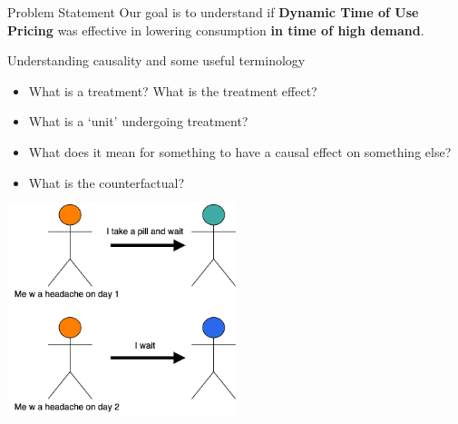 \documentclass{beamer}
\begin{document}
\begin{frame}{Problem Statement}
  Our goal is to understand if \textbf{Dynamic Time of Use Pricing} was effective in lowering consumption \textbf{in time of high demand}.
\end{frame}


\begin{frame}{Understanding causality and some useful terminology}
  \begin{itemize}
    \item<+-> What is a treatment? What is the treatment effect?
    \item<+-> What is a `unit' undergoing treatment?
    \item<+-> What does it mean for something to have a causal effect on something else?
    \item<+-> What is the counterfactual?
  \end{itemize}
    \centering
    \includegraphics[width=0.5\textwidth]{images/headache-treatment-effect.png}
\end{frame}
\end{document}
